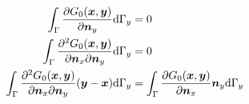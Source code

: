 \documentclass[a4paper, 10pt]{article}
\newcommand{\td}{\mathrm{d}}
\newcommand{\sx}{\bm{\mathnormal{x}}}
\newcommand{\sy}{\bm{\mathnormal{y}}}
\newcommand{\sn}{\bm{\mathnormal{n}}}
\begin{document}
\begin{align}
	\int_\Gamma \frac{\partial G_0(\sx, \sy)}{\partial \sn_y} \td \Gamma_y & = 0 \\
	\int_\Gamma \frac{\partial^2 G_0(\sx, \sy)}{\partial \sn_x \partial \sn_y} \td \Gamma_y & = 0 \\
	\int_\Gamma \frac{\partial^2 G_0(\sx, \sy)}{\partial \sn_x \partial \sn_y}(\sy - \sx) \td \Gamma_y & = \int_\Gamma \frac{\partial G_0(\sx, \sy)}{\partial \sn_x} \sn_y \td \Gamma_y 
\end{align}
\end{document}
